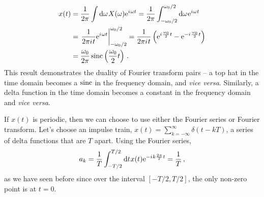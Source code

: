 \begin{enumerate}
  \begin{align*}
    x(t) &= \frac{1}{2\pi}\int \mathrm{d}\omega\mkern1muX(\omega)\mathrm{e}^{{i\mkern1mu}\omega t}
    = \frac{1}{2\pi}\int_{-\omega_0/2}^{\omega_0/2} \mathrm{d}\omega\mkern1mu \mathrm{e}^{{i\mkern1mu}\omega t} \\
    &= \left. \frac{1}{2\pi{i\mkern1mu} t} \mathrm{e}^{{i\mkern1mu}\omega t}\right|_{-\omega_0/2}^{\omega_0/2}
    = \frac{1}{2\pi{i\mkern1mu} t} \left(\mathrm{e}^{{i\mkern1mu}\frac{\omega_0}{2}t} - \mathrm{e}^{-{i\mkern1mu}\frac{\omega_0}{2}t}\right) \\
    &= \frac{\omega_0}{2\pi}\operatorname{sinc}\left(\frac{\omega_0}{2}t\right) \,.
  \end{align*}
  This result demonstrates the duality of Fourier transform pairs -- a top hat in the
  time domain becomes a $\operatorname{sinc}$ in the frequency domain, and \textit{vice versa}. Similarly,
  a delta function in the time domain becomes a constant in the frequency domain and
  \textit{vice versa}.
\end{enumerate}
%
If $x(t)$ is periodic, then we can choose to use either the Fourier series or Fourier
transform. Let's choose an impulse train, $x(t) = \sum_{k=-\infty}^\infty\delta(t - kT)$,
a series of delta functions that are $T$ apart. Using the Fourier series,
%
\begin{displaymath}
  a_k = \frac{1}{T}\int_{-T/2}^{T/2}\mathrm{d}t\mkern1mu x(t)\mathrm{e}^{-{i\mkern1mu} k\frac{2\pi}{T}t} = \frac{1}{T} \,,
\end{displaymath}
%
as we have seen before since over the interval $[-T/2,T/2]$, the only non-zero point is
at $t=0$.

